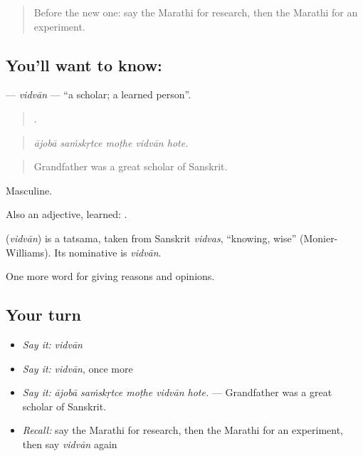 \label{lesson:MR-C372-vidvan}



\begin{quote}
Before the new one: say the Marathi for research, then the Marathi for an experiment.
\end{quote}

\subsection*{You'll want to know: }
\textbf{} — \emph{vidvān} — \textquotedblleft{}a scholar; a learned person\textquotedblright{}.

\begin{quote}
    .
\end{quote}

\begin{quote}
\emph{ājobā saṁskṛtce moṭhe vidvān hote.}
\end{quote}

\begin{quote}
Grandfather was a great scholar of Sanskrit.
\end{quote}

Masculine.

Also an adjective, learned:  .

\begin{cousinweb}
\textbf{} (\emph{vidvān}) is a tatsama, taken from Sanskrit \emph{vidvas}, \textquotedblleft{}knowing, wise\textquotedblright{} (Monier-Williams). Its nominative is \emph{vidvān}.
\end{cousinweb}

\begin{grammarlens}[title={What you've built}]
One more word for giving reasons and opinions.
\end{grammarlens}

\subsection*{Your turn}
\begin{itemize}
\raggedright
  \item \emph{Say it:} \emph{vidvān}
  \item \emph{Say it:} \emph{vidvān}, once more
  \item \emph{Say it:} \emph{ājobā saṁskṛtce moṭhe vidvān hote.} — Grandfather was a great scholar of Sanskrit.
  \item \emph{Recall:} say the Marathi for research, then the Marathi for an experiment, then say \emph{vidvān} again
\end{itemize}

